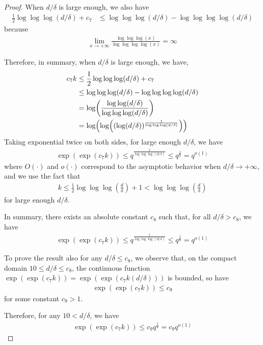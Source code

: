 \documentclass[11pt]{amsart}
\numberwithin{equation}{section}
\numberwithin{equation}{section}
\DeclarePairedDelimiter{\paren}{(}{)}
\begin{document}
\begin{proof}
When $d/\delta $ is large enough, we also have
\begin{align*}
    \frac{1}{2} \log\log\log (d/\delta)+c_7  
    &\le \log\log\log(d/\delta) - \log\log\log\log(d/\delta)
\end{align*}
because
\begin{align*}
    \lim_{x\to +\infty}\frac{\log\log\log(x)}{\log\log\log\log(x)}=\infty
\end{align*}

Therefore, in summary, when $d/\delta $ is large enough, we have,
\begin{align*}
    c_7 k &\le \frac{1}{2} \log\log\log (d/\delta)+c_7  \\
    &\le \log\log\log(d/\delta) - \log\log\log\log(d/\delta)  \\
    &= \log \paren*{ \frac{ \log\log(d/\delta)}{\log \log \log (d/\delta)}} \\
    &= \log \paren*{ \log \paren*{ \paren*{\log(d/\delta)}^\frac{1}{\log\log\log(d/\delta)} } } \end{align*}
Taking exponential twice on both sides, for large enough $d/\delta$, we have
\begin{align*}  {\exp(\exp(c_7k))} \le q^{\frac{1}{\log\log\log(d/\delta)}} \le q^{\frac{1}{k}} = q^{o(1)}
\end{align*}
where $O( \cdot)$ and $o(\cdot)$ correspond to the asymptotic behavior when $d/\delta \to +\infty$, and we use the fact that
\begin{align*}
    k \le \frac{1}{2}\log\log\log\!\left(\frac{d}{\delta}\right)+1
	< \log\log\log\!\left(\frac{d}{\delta}\right)
\end{align*}
for large enough $d/\delta$.

In summary, there exists an absolute constant $c_8$ such that, for all $d/\delta>c_8$, we have
\begin{align*}  {\exp(\exp(c_7k))} \le q^{\frac{1}{\log\log\log(d/\delta)}} \le q^{\frac{1}{k}} = q^{o(1)}
\end{align*}

To prove the result also for any $d/\delta \le c_8$, we observe that, on the compact domain $10\le d/\delta \le c_8$, the continuous function ${\exp(\exp(c_7k))}={\exp(\exp(c_7k(d/\delta)))}$ is bounded, so have
\begin{align*}
    {\exp(\exp(c_7k))} \le c_9
\end{align*}
for some constant $c_9>1$.

Therefore, for any $10<d/\delta $, we have
\begin{align*}  {\exp(\exp(c_7k))} \le c_9q^{\frac{1}{k}} = c_9q^{o(1)}
\end{align*}



\end{proof}
\end{document}
